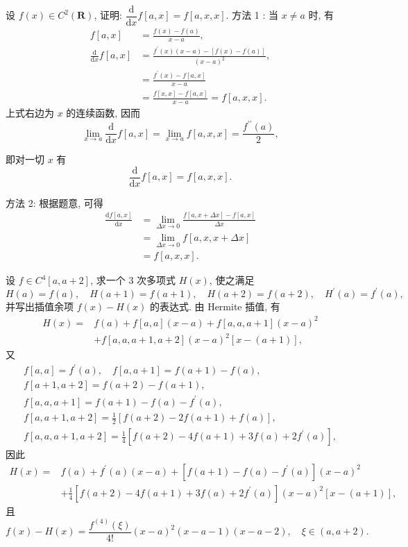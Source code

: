   \begin{tcolorbox}[enhanced,colback=10,colframe=9,breakable,coltitle=green!25!black,title=2024]
 设 $ f(x) \in C^{2}(\mathbf{R}) $, 证明:
$%
\dfrac{\mathrm{d}}{\mathrm{d} x} f[a, x]=f[a, x, x] .
$%
 \tcblower
 方法 1 : 当 $ x \neq a $ 时, 有
$$
\begin{aligned}
f  [a, x]&=\frac{f(x)-f(a)}{x-a},  \\
\frac{\mathrm{d}}{\mathrm{d} x} f[a, x] & =\frac{f^{\prime}(x)(x-a)-[f(x)-f(a)]}{(x-a)^{2}}, \\
& =\frac{f^{\prime}(x)-f[a, x]}{x-a} \\
& =\frac{f[x, x]-f[a, x]}{x-a}=f[a, x, x] .
\end{aligned}
$$
上式右边为 $ x $ 的连续函数, 因而
$$
\lim _{x \rightarrow a} \frac{\mathrm{d}}{\mathrm{d} x} f[a, x]=\lim _{x \rightarrow a} f[a, x, x]=\frac{f^{\prime \prime}(a)}{2},
$$

即对一切 $ x $ 有
$$
\frac{\mathrm{d}}{\mathrm{d} x} f[a, x]=f[a, x, x] .
$$

方法 2: 根据题意, 可得
$$
\begin{aligned}
\frac{\mathrm{d} f[a, x]}{\mathrm{d} x} & =\lim _{\Delta x \rightarrow 0} \frac{f[a, x+\Delta x]-f[a, x]}{\Delta x} \\
& =\lim _{\Delta x \rightarrow 0} f[a, x, x+\Delta x] \\
& =f[a, x, x] .
\end{aligned}
$$
 \end{tcolorbox}


    \begin{tcolorbox}[enhanced,colback=10,colframe=9,breakable,coltitle=green!25!black,title=2024]
 设 $ f \in C^{4}[a, a+2] $, 求一个 3 次多项式 $ H(x) $, 使之满足
$$
H(a)=f(a), \quad H(a+1)=f(a+1), \quad H(a+2)=f(a+2), \quad H^{\prime}(a)=f^{\prime}(a),
$$
并写出插值余项 $ f(x)-H(x) $ 的表达式.
 \tcblower
 由 Hermite 插值, 有
$$
\begin{aligned}
H(x)= & f(a)+f[a, a](x-a)+f[a, a, a+1](x-a)^{2} \\
& +f[a, a, a+1, a+2](x-a)^{2}[x-(a+1)],
\end{aligned}
$$
又
$$
\begin{array}{c}
f[a, a]=f^{\prime}(a), \quad f[a, a+1]=f(a+1)-f(a), \\
f[a+1, a+2]=f(a+2)-f(a+1), \\
f[a, a, a+1]=f(a+1)-f(a)-f^{\prime}(a), \\
f[a, a+1, a+2]=\frac{1}{2}[f(a+2)-2 f(a+1)+f(a)], \\
f[a, a, a+1, a+2]=\frac{1}{4}\left[f(a+2)-4 f(a+1)+3 f(a)+2 f^{\prime}(a)\right],
\end{array}
$$
因此
$$
\begin{aligned}
H(x)= & f(a)+f^{\prime}(a)(x-a)+\left[f(a+1)-f(a)-f^{\prime}(a)\right](x-a)^{2} \\
& +\frac{1}{4}\left[f(a+2)-4 f(a+1)+3 f(a)+2 f^{\prime}(a)\right](x-a)^{2}[x-(a+1)],
\end{aligned}
$$
且
$$
f(x)-H(x)=\frac{f^{(4)}(\xi)}{4!}(x-a)^{2}(x-a-1)(x-a-2), \quad \xi \in(a, a+2) .
$$
 \end{tcolorbox}


